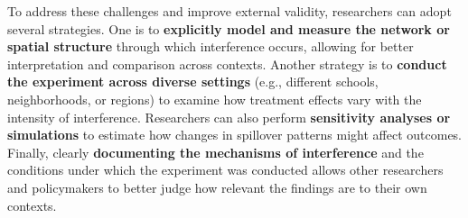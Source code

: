 \documentclass[
  letterpaper,
  DIV=11,
  numbers=noendperiod]{scrartcl}
\begin{document}
To address these challenges and improve external validity, researchers
can adopt several strategies. One is to \textbf{explicitly model and
measure the network or spatial structure} through which interference
occurs, allowing for better interpretation and comparison across
contexts. Another strategy is to \textbf{conduct the experiment across
diverse settings} (e.g., different schools, neighborhoods, or regions)
to examine how treatment effects vary with the intensity of
interference. Researchers can also perform \textbf{sensitivity analyses
or simulations} to estimate how changes in spillover patterns might
affect outcomes. Finally, clearly \textbf{documenting the mechanisms of
interference} and the conditions under which the experiment was
conducted allows other researchers and policymakers to better judge how
relevant the findings are to their own contexts.
\end{document}
